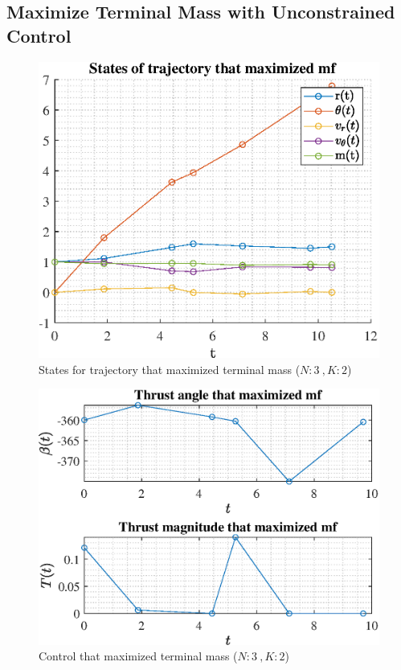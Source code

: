 \documentclass[]{article}
\begin{document}
	\subsection{Maximize Terminal Mass with Unconstrained Control}
	\begin{figure}
		\centering
		\includegraphics[scale=0.75]{states_N3_K2_C2_mf.eps}
		\caption{States for trajectory that maximized terminal mass (\(N:3\ , K:2\))}
		\label{fig:states_N3_K2_C2_mf}
	\end{figure}
	\begin{figure}
		\centering
		\includegraphics[scale=0.75]{control_N3_K2_C2_mf.eps}
		\caption{Control that maximized terminal mass (\(N:3\ , K:2\))}
		\label{fig:control_N3_K2_C2_mf}
	\end{figure}
\end{document}
